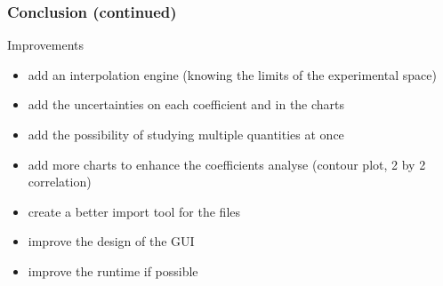 \documentclass[compress, english, aspectratio=169]{beamer}
\begin{document}
\begin{frame}
\frametitle{Conclusion (continued)}
\begin{block}{Improvements}
\begin{itemize}
\item add an interpolation engine (knowing the limits of the experimental space)
\item add the uncertainties on each coefficient and in the charts
\item add the possibility of studying multiple quantities at once
\item add more charts to enhance the coefficients analyse (contour plot, 2 by 2 correlation)
\item create a better import tool for the files
\item improve the design of the GUI
\item improve the runtime if possible
\end{itemize}
\end{block}
\end{frame}
\end{document}
